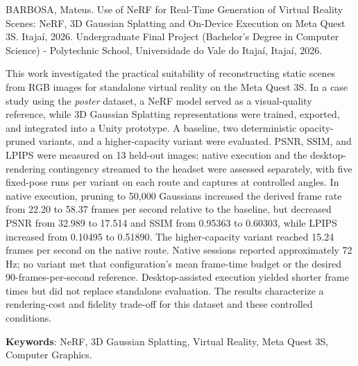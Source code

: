 \begin{Abstract}
BARBOSA, Mateus. Use of NeRF for Real-Time Generation of Virtual Reality Scenes: NeRF, 3D Gaussian Splatting and On-Device Execution on Meta Quest 3S. Itajaí, 2026. Undergraduate Final Project (Bachelor's Degree in Computer Science) - Polytechnic School, Universidade do Vale do Itajaí, Itajaí, 2026.

This work investigated the practical suitability of reconstructing static scenes from RGB images for standalone virtual reality on the Meta Quest 3S. In a case study using the \textit{poster} dataset, a NeRF model served as a visual-quality reference, while 3D Gaussian Splatting representations were trained, exported, and integrated into a Unity prototype. A baseline, two deterministic opacity-pruned variants, and a higher-capacity variant were evaluated. PSNR, SSIM, and LPIPS were measured on 13 held-out images; native execution and the desktop-rendering contingency streamed to the headset were assessed separately, with five fixed-pose runs per variant on each route and captures at controlled angles. In native execution, pruning to 50,000 Gaussians increased the derived frame rate from 22.20 to 58.37 frames per second relative to the baseline, but decreased PSNR from 32.989 to 17.514 and SSIM from 0.95363 to 0.60303, while LPIPS increased from 0.10495 to 0.51890. The higher-capacity variant reached 15.24 frames per second on the native route. Native sessions reported approximately 72 Hz; no variant met that configuration's mean frame-time budget or the desired 90-frames-per-second reference. Desktop-assisted execution yielded shorter frame times but did not replace standalone evaluation. The results characterize a rendering-cost and fidelity trade-off for this dataset and these controlled conditions.

\textbf{Keywords}: NeRF, 3D Gaussian Splatting, Virtual Reality, Meta Quest 3S, Computer Graphics.
\end{Abstract}
